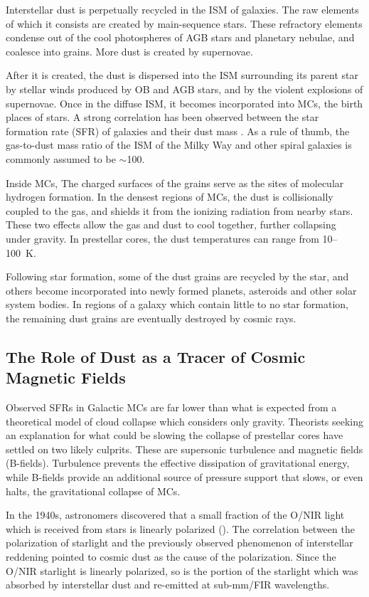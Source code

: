 Interstellar dust is perpetually recycled in the ISM of galaxies. The raw elements of which it consists are created by main-sequence stars. These refractory elements condense out of the cool photospheres of AGB stars and planetary nebulae, and coalesce into grains. More dust is created by supernovae.

After it is created, the dust is dispersed into the ISM surrounding its parent star by stellar winds produced by OB and AGB stars, and by the violent explosions of supernovae. Once in the diffuse ISM, it becomes incorporated into MCs, the birth places of stars. A strong correlation has been observed between the star formation rate (SFR) of galaxies and their dust mass \citep{da2010new}. As a rule of thumb, the gas-to-dust mass ratio of the ISM of the Milky Way and other spiral galaxies is commonly assumed to be $\sim$100.

Inside MCs, The charged surfaces of the grains serve as the sites of molecular hydrogen formation. In the densest regions of MCs, the dust is collisionally coupled to the gas, and shields it from the ionizing radiation from nearby stars. These two effects allow the gas and dust to cool together, further collapsing under gravity. In prestellar cores, the dust temperatures can range from 10--100~K.

Following star formation, some of the dust grains are recycled by the star, and others become incorporated into newly formed planets, asteroids and other solar system bodies. In regions of a galaxy which contain little to no star formation, the remaining dust grains are eventually destroyed by cosmic rays.

\subsection{The Role of Dust as a Tracer of Cosmic Magnetic Fields}\label{dust_fields}

Observed SFRs in Galactic MCs are far lower than what is expected from a theoretical model of cloud collapse which considers only gravity. Theorists seeking an explanation for what could be slowing the collapse of prestellar cores have settled on two likely culprits. These are supersonic turbulence and magnetic fields (B-fields). Turbulence prevents the effective dissipation of gravitational energy, while B-fields provide an additional source of pressure support that slows, or even halts, the gravitational collapse of MCs.

In the 1940s, astronomers discovered that a small fraction of the O/NIR light which is received from stars is linearly polarized (\citet{hall1949observations,hiltner1949polarization}). The correlation between the polarization of starlight and the previously observed phenomenon of interstellar reddening pointed to cosmic dust as the cause of the polarization. Since the O/NIR starlight is linearly polarized, so is the portion of the starlight which was absorbed by interstellar dust and re-emitted at sub-mm/FIR wavelengths.

